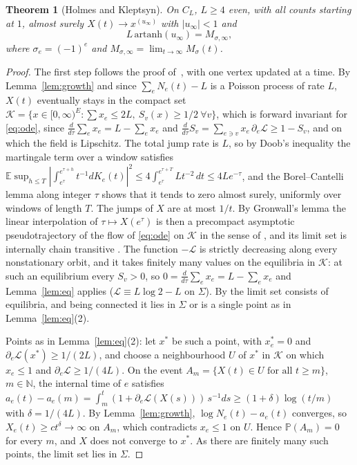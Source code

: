 \documentclass[11pt]{amsart}
\newtheorem{theorem}{Theorem}\newtheorem{lemma}[theorem]{Lemma}\newtheorem{proposition}[theorem]{Proposition}
\theoremstyle{remark}\newtheorem{remark}[theorem]{Remark}
\begin{document}
\begin{theorem}[Holmes and Kleptsyn]\label{thm:conv}
On $C_L$, $L\ge4$ even, with all counts starting at $1$, almost surely $X(t)\to x^{(u_\infty)}$ with $|u_\infty|<1$ and
\[ L\,\mathrm{artanh}(u_\infty)=M_{\sigma,\infty}, \]
where $\sigma_e=(-1)^e$ and $M_{\sigma,\infty}=\lim_{t\to\infty}M_\sigma(t)$.
\end{theorem}
\begin{proof}
The first step follows the proof of~\cite[Theorem~1.1(b)]{BBCL}, with one vertex updated at a time.
By Lemma~\ref{lem:growth} and since $\sum_eN_e(t)-L$ is a Poisson process of rate $L$, $X(t)$ eventually stays in the
compact set $\mathcal{K}=\{x\in[0,\infty)^E:\sum x_e\le 2L,\ S_v(x)\ge1/2\ \forall v\}$, which is forward invariant for
\eqref{eq:ode}, since $\frac{d}{d\tau}\sum_ex_e=L-\sum_ex_e$ and $\frac{d}{d\tau}S_v=\sum_{e\ni v}x_e\,\partial_e\mathcal{L}\ge1-S_v$,
and on which the field is Lipschitz. The total jump rate is $L$, so by Doob's inequality the martingale
term over a window satisfies
$\mathbb{E}\sup_{h\le T}|\int_{e^\tau}^{e^{\tau+h}}t^{-1}dK_e(t)|^2\le4\int_{e^\tau}^{e^{\tau+T}}Lt^{-2}\,dt\le4Le^{-\tau}$,
and the Borel--Cantelli lemma along integer $\tau$ shows that it tends to zero almost surely, uniformly over windows of
length $T$. The jumps of $X$ are at most $1/t$. By Gronwall's lemma the linear interpolation of $\tau\mapsto X(e^\tau)$ is
then a precompact asymptotic pseudotrajectory of the flow of \eqref{eq:ode} on $\mathcal{K}$ in the sense of
\cite[Section~3]{Ben99}, and its limit set is internally chain transitive \cite[Theorem~5.7]{Ben99}. The function
$-\mathcal{L}$ is strictly decreasing along every nonstationary orbit, and it takes finitely many values on the equilibria in $\mathcal{K}$: at such an equilibrium every $S_v>0$, so
$0=\frac{d}{d\tau}\sum_ex_e=L-\sum_ex_e$ and Lemma~\ref{lem:eq} applies ($\mathcal{L}\equiv L\log2-L$ on $\Sigma$). By \cite[Proposition~6.4]{Ben99} the limit set
consists of equilibria, and being connected it lies in $\Sigma$ or is a single point as in Lemma~\ref{lem:eq}(2).

Points as in Lemma~\ref{lem:eq}(2): let $x^*$ be such a point, with $x^*_e=0$ and $\partial_e\mathcal{L}(x^*)\ge1/(2L)$, and choose a
neighbourhood $U$ of $x^*$ in $\mathcal{K}$ on which $x_e\le1$ and $\partial_e\mathcal{L}\ge1/(4L)$. On the event
$A_m=\{X(t)\in U\text{ for all }t\ge m\}$, $m\in\mathbb{N}$, the internal time of $e$ satisfies
$a_e(t)-a_e(m)=\int_m^t(1+\partial_e\mathcal{L}(X(s)))\,s^{-1}ds\ge(1+\delta)\log(t/m)$ with $\delta=1/(4L)$. By
Lemma~\ref{lem:growth}, $\log N_e(t)-a_e(t)$ converges, so $X_e(t)\ge ct^{\delta}\to\infty$ on $A_m$, which contradicts
$x_e\le1$ on $U$. Hence $\mathbb{P}(A_m)=0$ for every $m$, and $X$ does not converge to $x^*$. As there are finitely many
such points, the limit set lies in $\Sigma$.


\end{proof}
\end{document}
